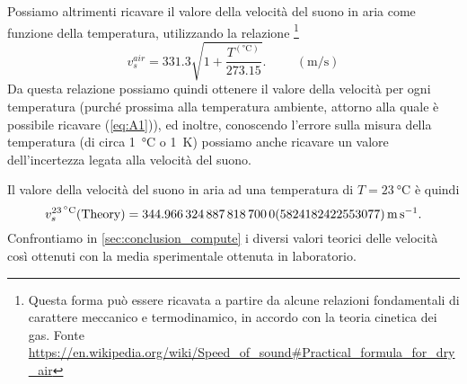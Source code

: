 \documentclass[
    prl,
    reprint, 
    superscriptaddress, 
    altaffilletter, 
    amsmath, 
    amssymb, 
    a4paper,
    varvw]{revtex4-2}
\begin{document}
Possiamo altrimenti ricavare il valore della velocità del suono in aria come funzione della temperatura, utilizzando la relazione \footnote{Questa forma può essere ricavata a partire da alcune relazioni fondamentali di carattere meccanico e termodinamico, in accordo con la teoria cinetica dei gas. Fonte \url{https://en.wikipedia.org/wiki/Speed_of_sound\#Practical_formula_for_dry_air}}\begin{equation}
    v_s^{air} = 331.3\sqrt{1+\frac{T^{(\si{\celsius})}}{273.15}}.\hspace{1cm}(\si{\metre\per\second})\label{eq:A1}
\end{equation} Da questa relazione possiamo quindi ottenere il valore della velocità per ogni temperatura (purché prossima alla temperatura ambiente, attorno alla quale è possibile ricavare (\ref{eq:A1})), ed inoltre, conoscendo l'errore sulla misura della temperatura (di circa \SI{1}{\celsius} o \SI{1}{\kelvin}) possiamo anche ricavare un valore dell'incertezza legata alla velocità del suono. 

Il valore della velocità del suono in aria ad una temperatura di $T=\SI{23}{\celsius}$ è quindi \[v_s^{\SI{23}{\celsius}}(\text{Theory})=\SI{344.9663248878187 +- 0.5824182422553077}{\metre\per\second}.\] Confrontiamo in \ref{sec:conclusion_compute} i diversi valori teorici delle velocità così ottenuti con la media sperimentale ottenuta in laboratorio. 

\setcounter{table}{0}
\renewcommand{\thetable}{A-\Roman{table}}
\end{document}

